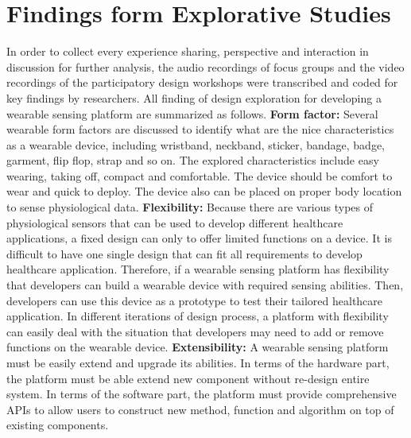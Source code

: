 \section{Findings form Explorative Studies}
In order to collect every experience sharing, perspective and interaction in discussion for further analysis, the audio recordings of focus groups and the video recordings of the participatory design workshops were transcribed and coded for key findings by researchers. All finding of design exploration for developing a wearable sensing platform are summarized as follows.
\vspace{15pt}
\newline
\textbf{Form factor:}\newline
Several wearable form factors are discussed to identify what are the nice characteristics as a wearable device, including wristband, neckband, sticker, bandage, badge, garment, flip flop, strap and so on. The explored characteristics include easy wearing, taking off, compact and comfortable. The device should be comfort to wear and quick to deploy. The device also can be placed on proper body location to sense physiological data.
\vspace{10pt}
\newline
\textbf{Flexibility:}\newline
Because there are various types of physiological sensors that can be used to develop different healthcare applications, a fixed design can only to offer limited functions on a device. It is difficult to have one single design that can fit all requirements to develop healthcare application. Therefore, if a wearable sensing platform has flexibility that developers can build a wearable device with required sensing abilities. Then, developers can use this device as a prototype to test their tailored healthcare application. In different iterations of design process, a platform with flexibility can easily deal with the situation that developers may need to add or remove functions on the wearable device.
\vspace{10pt}
\newline
\textbf{Extensibility:}\newline
A wearable sensing platform must be easily extend and upgrade its abilities. In terms of the hardware part, the platform must be able extend new component without re-design entire system. In terms of the software part, the platform must provide comprehensive APIs to allow users to construct new method, function and algorithm on top of existing components.
\vspace{10pt}
